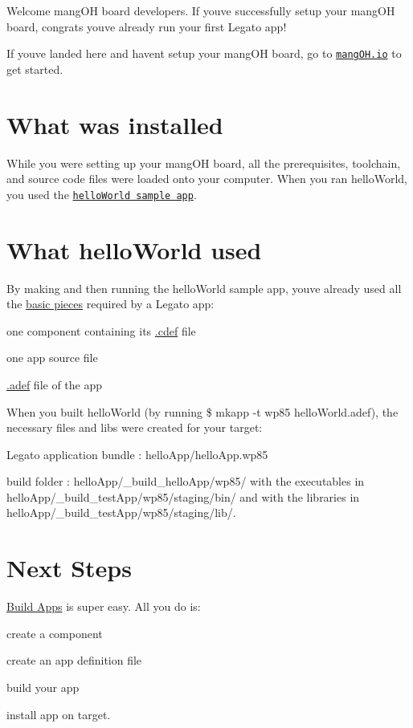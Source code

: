 Welcome mang\+OH board developers. If you\textquotesingle{}ve successfully setup your mang\+OH board, congrats you\textquotesingle{}ve already run your first Legato app!

If you\textquotesingle{}ve landed here and haven\textquotesingle{}t setup your mang\+OH board, go to \href{http://mangoh.io/mangoh-red-resources-getting-started}{\tt mang\+O\+H.\+io} to get started.\hypertarget{mangohDevelopers_mangohDevelopers_installed}{}\section{What was installed}\label{mangohDevelopers_mangohDevelopers_installed}
While you were setting up your mang\+OH board, all the prerequisites, toolchain, and source code files were loaded onto your computer. When you ran {\ttfamily hello\+World}, you used the \href{https://github.com/legatoproject/legato-af/tree/master/apps/sample/helloWorld}{\tt hello\+World sample app}.\hypertarget{mangohDevelopers_mangohDevelopers_helloWorld}{}\section{What hello\+World used}\label{mangohDevelopers_mangohDevelopers_helloWorld}
By making and then running the hello\+World sample app, you\textquotesingle{}ve already used all the \hyperlink{getStartedApps}{basic pieces} required by a Legato app\+:
\begin{DoxyItemize}
\item one component containing its \hyperlink{defFilesCdef}{.cdef} file
\item one app source file
\item \hyperlink{defFilesAdef}{.adef} file of the app
\end{DoxyItemize}

When you built hello\+World (by running {\ttfamily \$ mkapp -\/t wp85 hello\+World.\+adef}), the necessary files and libs were created for your target\+:
\begin{DoxyItemize}
\item Legato application bundle \+: hello\+App/hello\+App.\+wp85
\item build folder \+: hello\+App/\+\_\+build\+\_\+hello\+App/wp85/ with the executables in hello\+App/\+\_\+build\+\_\+test\+App/wp85/staging/bin/ and with the libraries in hello\+App/\+\_\+build\+\_\+test\+App/wp85/staging/lib/.
\end{DoxyItemize}\hypertarget{mangohDevelopers_mangohDevelopers_nextSteps}{}\section{Next Steps}\label{mangohDevelopers_mangohDevelopers_nextSteps}
\hyperlink{buildAppsMain}{Build Apps} is super easy. All you do is\+:
\begin{DoxyItemize}
\item create a component
\item create an app definition file
\item build your app
\item install app on target.
\end{DoxyItemize}

